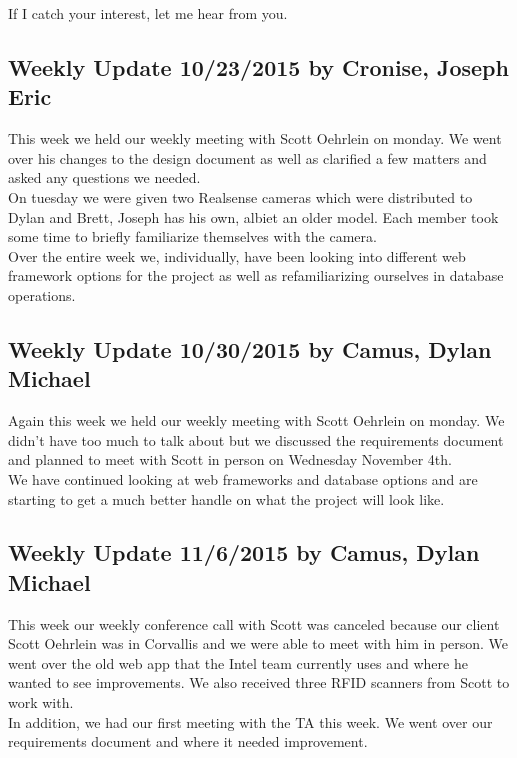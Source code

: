 \documentclass[10pt, onecolumn, twoside, peerreview]{IEEEtran}
\begin{document}
If I catch your interest, let me hear from you.

\subsection{Weekly Update 10/23/2015 by Cronise, Joseph Eric}
​This week we held our weekly meeting with Scott Oehrlein on monday. We went over his changes to the design document as well as clarified a few matters and asked any questions we needed.\\

On tuesday we were given two Realsense cameras which were distributed to Dylan and Brett, Joseph has his own, albiet an older model. Each member took some time to briefly familiarize themselves with the camera.\\

Over the entire week we, individually, have been looking into different web framework options for the project as well as refamiliarizing ourselves in database operations.

\subsection{Weekly Update 10/30/2015 by Camus, Dylan Michael}
Again this week we held our weekly meeting with Scott Oehrlein on monday. We didn't have too much to talk about but we discussed the requirements document and planned to meet with Scott in person on Wednesday November 4th.​\\

We have continued looking at web frameworks and database options and are starting to get a much better handle on what the project will look like.

\subsection{Weekly Update 11/6/2015 by Camus, Dylan Michael}
​This week our weekly conference call with Scott was canceled because our client Scott Oehrlein was in Corvallis and we were able to meet with him in person. We went over the old web app that the Intel team currently uses and where he wanted to see improvements. We also received three RFID scanners from Scott to work with.\\

​In addition, we had our first meeting with the TA this week. We went over our requirements document and where it needed improvement.
\end{document}
